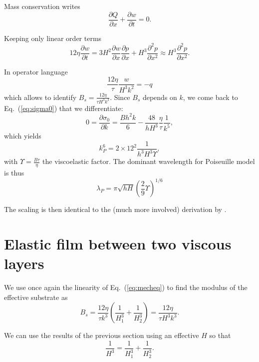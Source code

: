 \documentclass[12pt,a4paper]{revtex4}
\begin{document}
Mass conservation writes
\begin{equation}
\frac{\partial Q}{\partial x} + \frac{\partial w}{\partial t} = 0.
\label{eq:conservation}
\end{equation}

Keeping only linear order terms
\begin{equation}
12\eta\frac{\partial w}{\partial t} = 3H^2\frac{\partial w}{\partial x}\frac{\partial p}{\partial x} + H^3\frac{\partial^2 p}{\partial x^2} \approx H^3\frac{\partial^2 p}{\partial x^2}.
\label{eq:conservationLin}
\end{equation}

In operator language
\begin{equation}
\frac{12\eta}{\tau} \frac{w}{H^3k^2} = -q
\end{equation}
which allows to identify $B_s = \frac{12\eta}{\tau H^3k^3}$. Since $B_s$ depends on $k$, we come back to Eq.~(\ref{eq:sigma0}) that we differentiate:
\begin{equation}
0 = \frac{\partial\sigma_0}{\partial k}
 = \frac{Bh^2 k}{6} - \frac{48}{hH^3}\frac{\eta}{\tau}\frac{1}{k^5},
\end{equation}
which yields 
\begin{equation}
k_P^6 = 2\times 12^2 \frac{1}{h^3H^3\Upsilon},
\label{eq:Poiseuillek}
\end{equation}
with $\Upsilon = \frac{B\tau}{\eta}$ the viscoelastic factor. The dominant wavelength for Poiseuille model is thus
\begin{equation}
\lambda_P = \pi\sqrt{hH}\left(\frac{2}{9}\Upsilon\right)^{1/6}
\end{equation}

The scaling is then identical to the (much more involved) derivation by \citet{Huang2002}.

\section{Elastic film between two viscous layers}
We use once again the linearity of Eq.~(\ref{eq:mecheq}) to find the modulus of the effective substrate as 
\begin{equation}
B_s = \frac{12\eta}{\tau k^3} \left(\frac{1}{H_1^3}+\frac{1}{H_2^3}\right) = \frac{12\eta}{\tau H^3k^3}.
\end{equation}

We can use the results of the previous section using an effective $H$ so that
\begin{equation}
\frac{1}{H^3} = \frac{1}{H_1^3}+\frac{1}{H_2^3}.
\end{equation}
\end{document}
